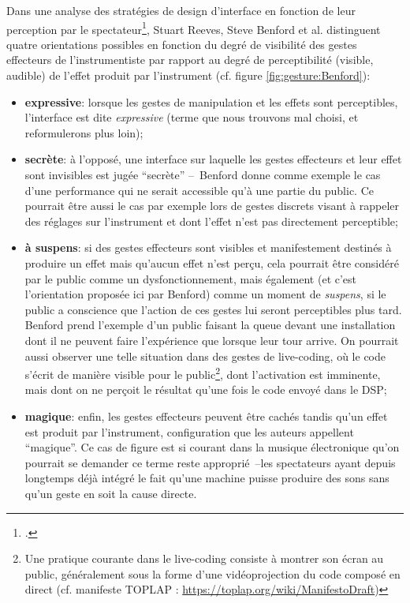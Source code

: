 \noindent Dans une analyse des stratégies de design d'interface en fonction de leur perception par le spectateur\footnote{\cite{reeves_designing_2005}.}, Stuart Reeves, Steve Benford et al. distinguent quatre orientations possibles en fonction du degré de visibilité des gestes effecteurs de l'instrumentiste par rapport au degré de perceptibilité (visible, audible) de l'effet produit par l'instrument (cf. figure \ref{fig:gesture:Benford}):
\vspace{-1em}
\begin{itemize}[noitemsep]
 	\item \textbf{expressive}: lorsque les gestes de manipulation et les effets sont perceptibles, l'interface est dite \textit{expressive} (terme que nous trouvons mal choisi, et reformulerons plus loin); 
 	\item \textbf{secrète}: à l'opposé, une interface sur laquelle les gestes effecteurs et leur effet sont invisibles est jugée ``secrète'' --~Benford donne comme exemple le cas d'une performance qui ne serait accessible qu'à une partie du public. Ce pourrait être aussi le cas par exemple lors de gestes discrets visant à rappeler des réglages sur l'instrument et dont l'effet n'est pas directement perceptible; 
 	\item \textbf{à suspens}: si des gestes effecteurs sont visibles et manifestement destinés à produire un effet mais qu'aucun effet n'est perçu, cela pourrait être considéré par le public comme un dysfonctionnement, mais également (et c'est l'orientation proposée ici par Benford) comme un moment de \textit{suspens}, si le public a conscience que l'action de ces gestes lui seront perceptibles plus tard. Benford prend l'exemple d'un public faisant la queue devant une installation dont il ne peuvent faire l'expérience que lorsque leur tour arrive. On pourrait aussi observer une telle situation dans des gestes de live-coding, où le code s'écrit de manière visible pour le public\footnote{Une pratique courante dans le live-coding consiste à montrer son écran au public, généralement sous la forme d'une vidéoprojection du code composé en direct (cf. manifeste TOPLAP : \url{https://toplap.org/wiki/ManifestoDraft})}, dont l'activation est imminente, mais dont on ne perçoit le résultat qu'une fois le code envoyé dans le \gls{DSP};
 	\item \textbf{magique}: enfin, les gestes effecteurs peuvent être cachés tandis qu'un effet est produit par l'instrument, configuration que les auteurs appellent ``magique''. Ce cas de figure est si courant dans la musique électronique qu'on pourrait se demander ce terme reste approprié~--les spectateurs ayant depuis longtemps déjà intégré le fait qu'une machine puisse produire des sons sans qu'un geste en soit la cause directe.
\end{itemize}
